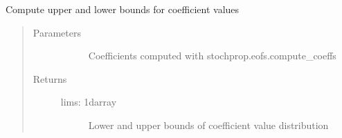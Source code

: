 \documentclass[letterpaper,10pt,english]{sphinxmanual}
\begin{document}
\begin{fulllineitems}
\label{\detokenize{stochprop.eofs:stochprop.eofs.define_coeff_limits}}
Compute upper and lower bounds for coefficient values
\begin{quote}\begin{description}
\item[{Parameters}] \leavevmode\begin{description}
\item[{}] \leavevmode
Coefficients computed with stochprop.eofs.compute\_coeffs

\end{description}

\item[{Returns}] \leavevmode\begin{description}
\item[{lims: 1darray}] \leavevmode
Lower and upper bounds of coefficient value distribution

\end{description}

\end{description}\end{quote}

\end{fulllineitems}

\end{document}
